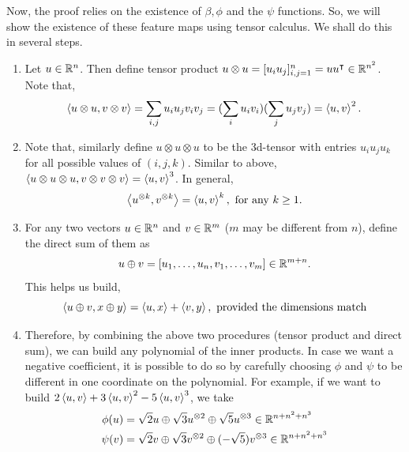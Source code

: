 \documentclass[12pt]{article}
\begin{document}
Now, the proof relies on the existence of $\beta, \phi$ and the $\psi$ functions. So, we will show the existence of these feature maps using tensor calculus. We shall do this in several steps.

\begin{enumerate}
    \item Let $u \in \mathbb{R}^n$. Then define tensor product $u \otimes u = [u_iu_j]_{i,j=1}^{n} = uu^{\intercal} \in \mathbb{R}^{n^2}$. Note that,
    \begin{equation*}
        \left\langle u \otimes u, v\otimes v \right\rangle = \sum_{i,j} u_i u_j v_i v_j = (\sum_i u_i v_i)(\sum_j u_j v_j) = \left\langle u,v \right\rangle^2.
    \end{equation*}
    \item Note that, similarly define $u \otimes u \otimes u$ to be the 3d-tensor with entries $u_iu_ju_k$ for all possible values of $(i,j,k)$. Similar to above, $\left\langle u \otimes u\otimes u, v\otimes v \otimes v \right\rangle = \left\langle u,v \right\rangle^3$. In general,
    \begin{equation*}
        \left\langle u^{\otimes k}, v^{\otimes k} \right\rangle = \left\langle u, v \right\rangle^k, \text{ for any } k \geq 1.
    \end{equation*}
    \item For any two vectors $u \in \mathbb{R}^n$ and $v \in \mathbb{R}^m$ ($m$ may be different from $n$), define the direct sum of them as 
    \begin{equation*}
        u \oplus v = [u_1, \dots, u_n, v_1, \dots, v_m] \in \mathbb{R}^{m+n}.
    \end{equation*}
    \noindent This helps us build,
    \begin{equation*}
        \left\langle u \oplus v, x \oplus y \right\rangle = \left\langle u, x \right\rangle + \left\langle v, y \right\rangle, \text{ provided the dimensions match}
    \end{equation*}
    \item Therefore, by combining the above two procedures (tensor product and direct sum), we can build any polynomial of the inner products. In case we want a negative coefficient, it is possible to do so by carefully choosing $\phi$ and $\psi$ to be different in one coordinate on the polynomial. For example, if we want to build $2\left\langle u, v \right\rangle + 3\left\langle u,v \right\rangle^2 - 5\left\langle u, v \right\rangle^3$, we take
    \begin{align*}
        \phi(u) & = \sqrt{2}u \oplus \sqrt{3}u^{\otimes 2} \oplus \sqrt{5}u^{\otimes 3} \in \mathbb{R}^{n + n^2 + n^3}\\
        \psi(v) & = \sqrt{2}v \oplus \sqrt{3}v^{\otimes 2} \oplus (-\sqrt{5})v^{\otimes 3} \in \mathbb{R}^{n + n^2 + n^3}
    \end{align*}

\end{enumerate}
\end{document}

